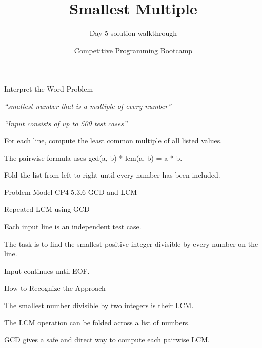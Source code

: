 \documentclass[aspectratio=169,11pt]{beamer}
\title[smallestmultiple]{Smallest Multiple}
\subtitle{Day 5 solution walkthrough}
\author[Solution Deck]{Competitive Programming Bootcamp}
\date{}
\begin{document}
\begin{frame}[plain]
  \titlepage
\end{frame}

\begin{frame}{Interpret the Word Problem}
\small
{}
\begin{tightitemize}
  \item \textit{``smallest number that is a multiple of every number''}
  \item \textit{``Input consists of up to 500 test cases''}
\end{tightitemize}

\vspace{0.18cm}
\begin{tightitemize}
  \item For each line, compute the least common multiple of all listed values.
  \item The pairwise formula uses gcd(a, b) * lcm(a, b) = a * b.
  \item Fold the list from left to right until every number has been included.
\end{tightitemize}
\end{frame}







\begin{frame}{Problem Model}
\small
{} CP4 5.3.6 GCD and LCM

\vspace{0.25cm}
 Repeated LCM using GCD

\vspace{0.25cm}
\begin{tightitemize}
  \item Each input line is an independent test case.
  \item The task is to find the smallest positive integer divisible by every number on the line.
  \item Input continues until EOF.
\end{tightitemize}
\end{frame}

\begin{frame}{How to Recognize the Approach}
\begin{tightitemize}
  \item The smallest number divisible by two integers is their LCM.
  \item The LCM operation can be folded across a list of numbers.
  \item GCD gives a safe and direct way to compute each pairwise LCM.
\end{tightitemize}
\end{frame}
\end{document}
